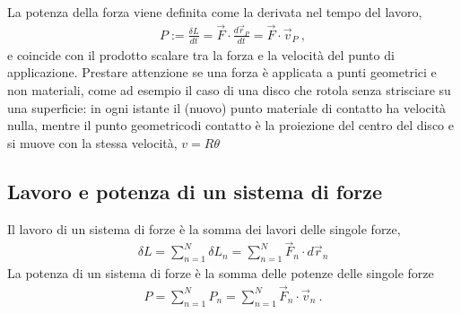 \documentclass[letterpaper,10pt,italian]{jupyterBook}
\begin{document}
\sphinxAtStartPar
{} La potenza della forza viene definita come la derivata nel tempo del lavoro,
\begin{equation*}
\begin{split}P := \frac{\delta L}{dt} = \vec{F} \cdot \frac{d \vec{r}_P}{d t} = \vec{F} \cdot \vec{v}_P \ , \end{split}
\end{equation*}
\sphinxAtStartPar
e coincide con il prodotto scalare tra la forza e la velocità del punto di applicazione. Prestare attenzione se una forza è applicata a punti geometrici e non materiali, come ad esempio il caso di una disco che rotola senza strisciare su una superficie: in ogni istante il (nuovo) punto materiale di contatto ha velocità nulla, mentre il punto geometricodi contatto è la proiezione del centro del disco e si muove con la stessa velocità, \(v = R \theta\)


\subsection{Lavoro e potenza di un sistema di forze}
\label{\detokenize{ch/mechanics/actions-work:lavoro-e-potenza-di-un-sistema-di-forze}}
\sphinxAtStartPar
{} Il lavoro di un sistema di forze è la somma dei lavori delle singole forze,
\begin{equation*}
\begin{split}\delta L = \sum_{n=1}^{N} \delta L_n = \sum_{n=1}^{N} \vec{F}_n \cdot d \vec{r}_n\end{split}
\end{equation*}
\sphinxAtStartPar
{} La potenza di un sistema di forze è la somma delle potenze delle singole forze
\begin{equation*}
\begin{split}P = \sum_{n=1}^{N} P_n = \sum_{n=1}^{N} \vec{F}_n \cdot \vec{v}_n \ .\end{split}
\end{equation*}
\end{document}
